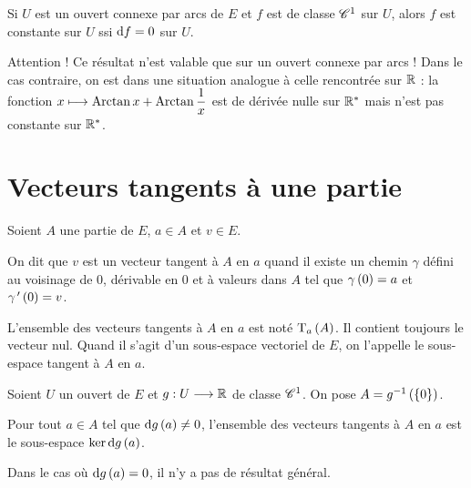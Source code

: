 \begin{theo}
Si \(U\) est un ouvert connexe par arcs de \(E\) et \(f\) est de classe \(\mathscr{C}^{1}\) sur \(U\), alors \(f\) est constante sur \(U\) ssi \(\odif{f}=0\) sur \(U\).
\end{theo}

\begin{rem}
Attention ! Ce résultat n'est valable que sur un ouvert connexe par arcs ! Dans le cas contraire, on est dans une situation analogue à celle rencontrée sur \(\mathbb{R}\) : la fonction \(x\longmapsto\operatorname{Arctan} x+\operatorname{Arctan}\dfrac{1}{x}\) est de dérivée nulle sur \(\mathbb{R}^*\) mais n'est pas constante sur \(\mathbb{R}^*\).
\end{rem}

\section{Vecteurs tangents à une partie}

\begin{defi}
Soient \(A\) une partie de \(E\), \(a\in A\) et \(v\in E\).

On dit que \(v\) est un vecteur tangent à \(A\) en \(a\) quand il existe un chemin \(\gamma\) défini au voisinage de \(0\), dérivable en \(0\) et à valeurs dans \(A\) tel que \(\gamma\left(0\right)=a\) et \(\gamma^{\,\prime}\left(0\right)=v\).
\end{defi}

L'ensemble des vecteurs tangents à \(A\) en \(a\) est noté \(\operatorname{T}_{a}\left(A\right)\). Il contient toujours le vecteur nul. Quand il s'agit d'un sous-espace vectoriel de \(E\), on l'appelle le sous-espace tangent à \(A\) en \(a\).

\begin{prop}
Soient \(U\) un ouvert de \(E\) et \(g:U\longrightarrow\mathbb{R}\) de classe \(\mathscr{C}^{1}\). On pose \(A=g^{-1}\left(\left\lbrace0\right\rbrace\right)\).

Pour tout \(a\in A\) tel que \(\odif{g}\paren{a}\not=0\), l'ensemble des vecteurs tangents à \(A\) en \(a\) est le sous-espace \(\ker\odif{g}\paren{a}\).
\end{prop}

Dans le cas où \(\odif{g}\paren{a}=0\), il n'y a pas de résultat général.

